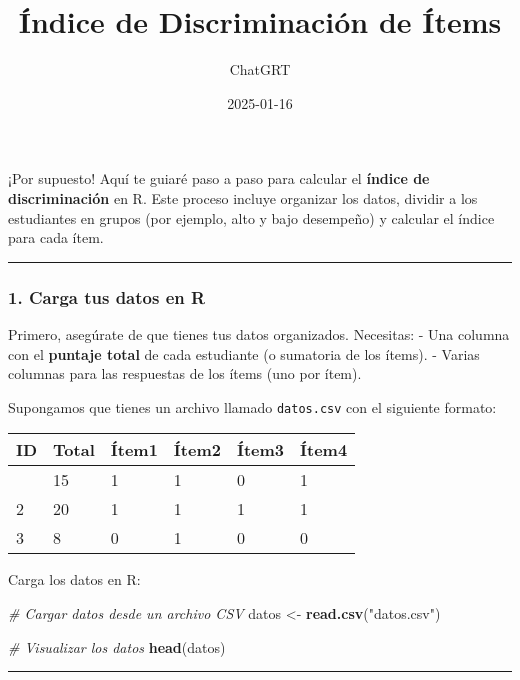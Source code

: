 \documentclass[
]{article}
\title{Índice de Discriminación de Ítems}
\author{ChatGRT}
\date{2025-01-16}
\newenvironment{Shaded}{\begin{snugshade}}{\end{snugshade}}
\newcommand{\CommentTok}[1]{\textcolor[rgb]{0.56,0.35,0.01}{\textit{#1}}}
\newcommand{\FunctionTok}[1]{\textcolor[rgb]{0.13,0.29,0.53}{\textbf{#1}}}
\newcommand{\NormalTok}[1]{#1}
\newcommand{\OtherTok}[1]{\textcolor[rgb]{0.56,0.35,0.01}{#1}}
\newcommand{\StringTok}[1]{\textcolor[rgb]{0.31,0.60,0.02}{#1}}
\begin{document}
\maketitle

¡Por supuesto! Aquí te guiaré paso a paso para calcular el
\textbf{índice de discriminación} en R. Este proceso incluye organizar
los datos, dividir a los estudiantes en grupos (por ejemplo, alto y bajo
desempeño) y calcular el índice para cada ítem.

\begin{center}\rule{0.5\linewidth}{0.5pt}\end{center}

\subsubsection{\texorpdfstring{\textbf{1. Carga tus datos en
R}}{1. Carga tus datos en R}}\label{carga-tus-datos-en-r}

Primero, asegúrate de que tienes tus datos organizados. Necesitas: - Una
columna con el \textbf{puntaje total} de cada estudiante (o sumatoria de
los ítems). - Varias columnas para las respuestas de los ítems (uno por
ítem).

Supongamos que tienes un archivo llamado \texttt{datos.csv} con el
siguiente formato:

\begin{longtable}[]{@{}llllll@{}}
\toprule\noalign{}
ID & Total & Ítem1 & Ítem2 & Ítem3 & Ítem4 \\
\midrule\noalign{}
\endhead
\bottomrule\noalign{}
\endlastfoot
1 & 15 & 1 & 1 & 0 & 1 \\
2 & 20 & 1 & 1 & 1 & 1 \\
3 & 8 & 0 & 1 & 0 & 0 \\
\end{longtable}

Carga los datos en R:

\begin{Shaded}
\begin{Highlighting}[]
\CommentTok{\# Cargar datos desde un archivo CSV}
\NormalTok{datos }\OtherTok{\textless{}{-}} \FunctionTok{read.csv}\NormalTok{(}\StringTok{"datos.csv"}\NormalTok{)}

\CommentTok{\# Visualizar los datos}
\FunctionTok{head}\NormalTok{(datos)}
\end{Highlighting}
\end{Shaded}

\begin{center}\rule{0.5\linewidth}{0.5pt}\end{center}
\end{document}
